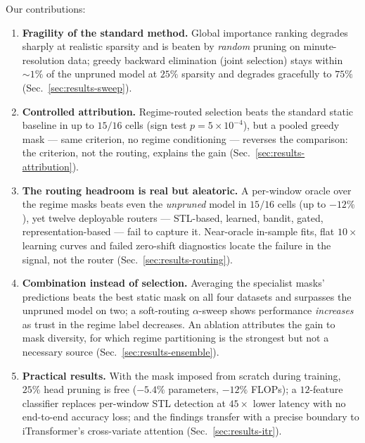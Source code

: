 Our contributions:
\begin{enumerate}
  \item \textbf{Fragility of the standard method.} Global importance
  ranking degrades sharply at realistic sparsity and is beaten by
  \emph{random} pruning on minute-resolution data; greedy backward
  elimination (joint selection) stays within ${\sim}1\%$ of the unpruned
  model at $25\%$ sparsity and degrades gracefully to $75\%$
  (Sec.~\ref{sec:results-sweep}).
  \item \textbf{Controlled attribution.} Regime-routed selection beats
  the standard static baseline in up to $15/16$ cells (sign test
  $p{=}5\times10^{-4}$), but a pooled greedy mask --- same criterion, no
  regime conditioning --- reverses the comparison: the criterion, not the
  routing, explains the gain (Sec.~\ref{sec:results-attribution}).
  \item \textbf{The routing headroom is real but aleatoric.} A per-window
  oracle over the regime masks beats even the \emph{unpruned} model in
  $15/16$ cells (up to $-12\%$), yet twelve deployable routers ---
  STL-based, learned, bandit, gated, representation-based --- fail to
  capture it. Near-oracle in-sample fits, flat $10\times$ learning curves
  and failed zero-shift diagnostics locate the failure in the signal, not
  the router (Sec.~\ref{sec:results-routing}).
  \item \textbf{Combination instead of selection.} Averaging the
  specialist masks' predictions beats the best static mask on all four
  datasets and surpasses the unpruned model on two; a soft-routing
  $\alpha$-sweep shows performance \emph{increases} as trust in the
  regime label decreases. An ablation attributes the gain to mask
  diversity, for which regime partitioning is the strongest but not a
  necessary source (Sec.~\ref{sec:results-ensemble}).
  \item \textbf{Practical results.} With the mask imposed from scratch
  during training, $25\%$ head pruning is free ($-5.4\%$ parameters,
  $-12\%$ FLOPs); a $12$-feature classifier replaces per-window STL
  detection at $45\times$ lower latency with no end-to-end accuracy loss;
  and the findings transfer with a precise boundary to iTransformer's
  cross-variate attention (Sec.~\ref{sec:results-itr}).
\end{enumerate}
